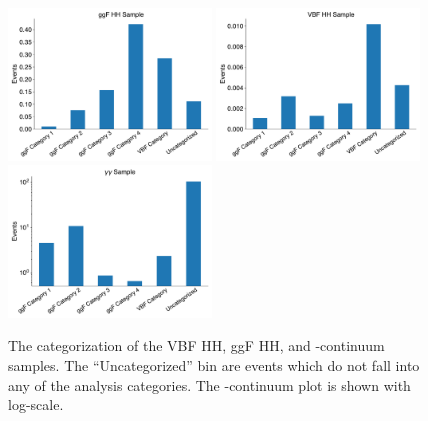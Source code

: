 \begin{figure}
  \centering
  \includegraphics[width=0.48\textwidth]{chapters/chapter6_vbf/images/category_breakdown/ggf_sample.pdf}
  \includegraphics[width=0.48\textwidth]{chapters/chapter6_vbf/images/category_breakdown/vbf_sample.pdf}
  \includegraphics[width=0.48\textwidth]{chapters/chapter6_vbf/images/category_breakdown/yy_sample.pdf}
  \caption[The categorization of the VBF HH, ggF HH, and \yy-continuum samples]{The categorization of the VBF HH, ggF HH, and \yy-continuum samples. The ``Uncategorized'' bin are events which do not fall into any of the analysis categories. The \yy-continuum plot is shown with log-scale.
  \label{fig:process-categorization}}
\end{figure}



